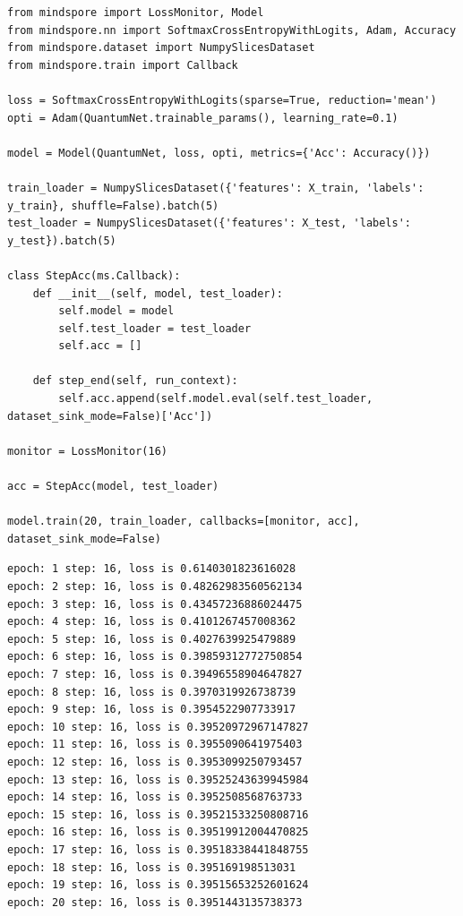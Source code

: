 \begin{lstlisting}
from mindspore import LossMonitor, Model  
from mindspore.nn import SoftmaxCrossEntropyWithLogits, Adam, Accuracy                                              
from mindspore.dataset import NumpySlicesDataset                               
from mindspore.train import Callback

loss = SoftmaxCrossEntropyWithLogits(sparse=True, reduction='mean')            
opti = Adam(QuantumNet.trainable_params(), learning_rate=0.1) 

model = Model(QuantumNet, loss, opti, metrics={'Acc': Accuracy()})  

train_loader = NumpySlicesDataset({'features': X_train, 'labels': y_train}, shuffle=False).batch(5) 
test_loader = NumpySlicesDataset({'features': X_test, 'labels': y_test}).batch(5)

class StepAcc(ms.Callback):                                                        
    def __init__(self, model, test_loader):
        self.model = model
        self.test_loader = test_loader
        self.acc = []

    def step_end(self, run_context):
        self.acc.append(self.model.eval(self.test_loader, dataset_sink_mode=False)['Acc'])

monitor = LossMonitor(16)              

acc = StepAcc(model, test_loader)                                               

model.train(20, train_loader, callbacks=[monitor, acc], dataset_sink_mode=False)
\end{lstlisting}

\begin{lstlisting}
epoch: 1 step: 16, loss is 0.6140301823616028
epoch: 2 step: 16, loss is 0.48262983560562134
epoch: 3 step: 16, loss is 0.43457236886024475
epoch: 4 step: 16, loss is 0.4101267457008362
epoch: 5 step: 16, loss is 0.4027639925479889
epoch: 6 step: 16, loss is 0.39859312772750854
epoch: 7 step: 16, loss is 0.39496558904647827
epoch: 8 step: 16, loss is 0.3970319926738739
epoch: 9 step: 16, loss is 0.3954522907733917
epoch: 10 step: 16, loss is 0.39520972967147827
epoch: 11 step: 16, loss is 0.3955090641975403
epoch: 12 step: 16, loss is 0.3953099250793457
epoch: 13 step: 16, loss is 0.39525243639945984
epoch: 14 step: 16, loss is 0.3952508568763733
epoch: 15 step: 16, loss is 0.39521533250808716
epoch: 16 step: 16, loss is 0.39519912004470825
epoch: 17 step: 16, loss is 0.39518338441848755
epoch: 18 step: 16, loss is 0.395169198513031
epoch: 19 step: 16, loss is 0.39515653252601624
epoch: 20 step: 16, loss is 0.3951443135738373
\end{lstlisting}

